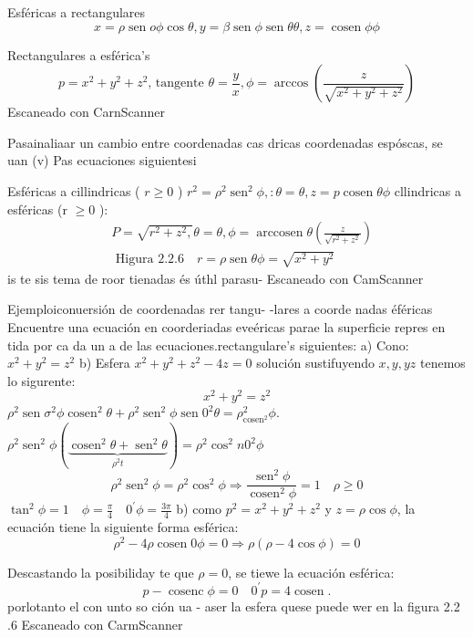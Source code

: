 Esféricas a rectangulares
$$
x=\rho \operatorname{sen} o \phi \cos \theta, y=\beta \operatorname{sen} \phi \operatorname{sen} \theta \theta, z=\operatorname{cosen} \phi \phi
$$

Rectangulares a esférica's
$$
p=x^2+y^2+z^2 \text {, tangente } \theta=\frac{y}{x}, \phi=\arccos \left(\frac{z}{\sqrt{x^2+y^2+z^2}}\right)
$$
Escaneado con CarnScanner




Pasainaliaar un cambio entre coordenadas
cas dricas coordenadas espóscas, se uan (v) Pas ecuaciones siguientesi

Esféricas a cillindricas ( $r \geq 0$ ) $r^2=\rho^2 \operatorname{sen}^2 \phi,: \theta=\theta, z=p \operatorname{cosen} \theta \phi$
cllindricas a esféricas (r $\geqslant 0$ ):
$$
\begin{aligned}
	& P=\sqrt{r^2+z^2,} \theta=\theta, \phi=\operatorname{arccosen} \theta\left(\frac{z}{\sqrt{r^2+z^2}}\right) \\
	& \text { Higura } 2.2 .6 \quad r=\rho \operatorname{sen} \theta \phi=\sqrt{x^2+y^2}
\end{aligned}
$$
is te sis tema de roor tienadas és úthl parasu-
Escaneado con CamScanner




Ejemploiconuersión de coordenadas rer tangu-
-lares a coorde nadas éféricas
Encuentre una ecuación en coorderiadas eveéricas parae la superficie repres en tida por ca da un a de las ecuaciones.rectangulare's siguientes:
a) Cono: $x^2+y^2=z^2$ b) Esfera $x^2+y^2+z^2-4 z=0$
solución sustifuyendo $x, y, y z$ tenemos lo sigurente:
$$
x^2+y^2=z^2
$$
$\rho^2 \operatorname{sen} \sigma^2 \phi \operatorname{cosen}^2 \theta+\rho^2 \operatorname{sen}^2 \phi \operatorname{sen} 0^2 \theta=\rho_{\operatorname{cosen}^2}^2 \phi$.
$\rho^2 \operatorname{sen}^2 \phi(\underbrace{\operatorname{cosen}^2 \theta+\operatorname{sen}^2 \theta}_{\rho^2 t})=\rho^2 \cos ^2 n 0^2 \phi$
$$
\rho^2 \operatorname{sen}^2 \phi=\rho^2 \cos ^2 \phi \Rightarrow \frac{\operatorname{sen}^2 \phi}{\operatorname{cosen}^2 \phi}=1 \quad \rho \geq 0
$$
$\tan ^2 \phi=1 \quad \phi=\frac{\pi}{4} \quad 0^{\prime} \phi=\frac{3 \pi}{4}$
b) como $p^2=x^2+y^2+z^2$ y $z=\rho \cos \phi$, la ecuación tiene la siguiente forma esférica:
$$
\rho^2-4 \rho \operatorname{cosen} 0 \phi=0 \Rightarrow \rho(\rho-4 \cos \phi)=0
$$

Descastando la posibiliday te que $\rho=0$, se tiewe la ecuación esférica:
$$
p-\operatorname{cosenc} \phi=0 \quad 0^{\prime} p=4 \operatorname{cosen} .
$$
porlotanto el con unto so ción ua
- aser la esfera quese puede wer en la figura 2.2 .6
Escaneado con CarmScanner


